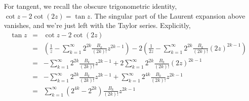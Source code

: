 \documentclass{article}
\begin{document}
For tangent, we recall the obscure trigonometric identity, $\cot z - 2 \cot (2z) = \tan z$.  The singular part of the Laurent expansion above vanishes, and we're just left with the Taylor series.  Explicitly,
\begin{eqnarray*}
\tan z &=& \cot z - 2 \cot (2z) \\
&=& \left(\frac{1}{z} - \sum_{k=1}^\infty 2^{2k} \frac{B_k}{(2k)!} z^{2k-1}\right) - 2 \left(\frac{1}{2z} - \sum_{k=1}^\infty 2^{2k} \frac{B_k}{(2k)!} (2z)^{2k-1}\right) \\
&=& - \sum_{k=1}^\infty 2^{2k} \frac{B_k}{(2k)!} z^{2k-1} + 2  \sum_{k=1}^\infty 2^{2k} \frac{B_k}{(2k)!} (2z)^{2k-1} \\
&=& - \sum_{k=1}^\infty 2^{2k} \frac{B_k}{(2k)!} z^{2k-1} + \sum_{k=1}^\infty 2^{4k} \frac{B_k}{(2k)!} z^{2k-1} \\
&=& \sum_{k=1}^\infty (2^{4k} - 2^{2k}) \frac{B_k}{(2k)!} z^{2k-1}
\end{eqnarray*}
\end{document}
